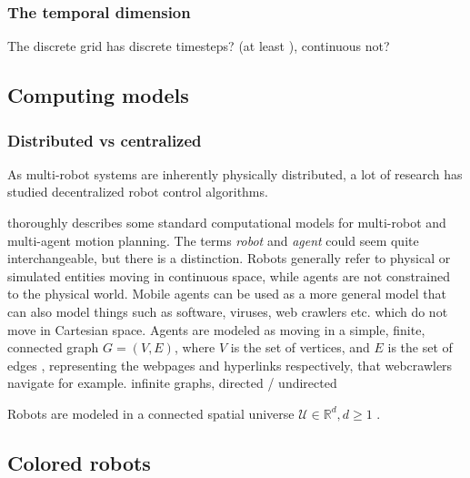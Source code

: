 \subsubsection{The temporal dimension}

The discrete grid has discrete timesteps? (at least \cite{siamcomp/DemaineFKMS19}), continuous not?






\subsection{Computing models}

\subsubsection{Distributed vs centralized}

As multi-robot systems are inherently physically distributed, a lot of research has studied decentralized robot control algorithms. 


\cite{flocchiniDistributedComputingMobile2019} thoroughly describes some standard computational models for multi-robot and multi-agent motion planning. 
The terms \emph{robot} and \emph{agent} could seem quite interchangeable, but there is a distinction. 
Robots generally refer to physical or simulated entities moving in continuous space, while agents are not constrained to the physical world. 
Mobile agents can be used as a more general model that can also model things such as software, viruses, web crawlers etc. \cite{flocchiniDistributedComputingMobile2019} which do not move in Cartesian space. 
Agents are modeled as moving in a simple, finite, connected graph $G = (V, E)$, where $V$ is the set of vertices, and $E$ is the set of edges \cite{flocchiniDistributedComputingMobile2019}, representing the webpages and hyperlinks respectively, that webcrawlers navigate for example. \TODO infinite graphs, directed / undirected

Robots are modeled in a connected spatial universe $\mathcal{U} \in \mathbb{R}^d, d \ge 1$ \cite{flocchiniDistributedComputingMobile2019}. \TODO 




\subsection{Colored robots}


